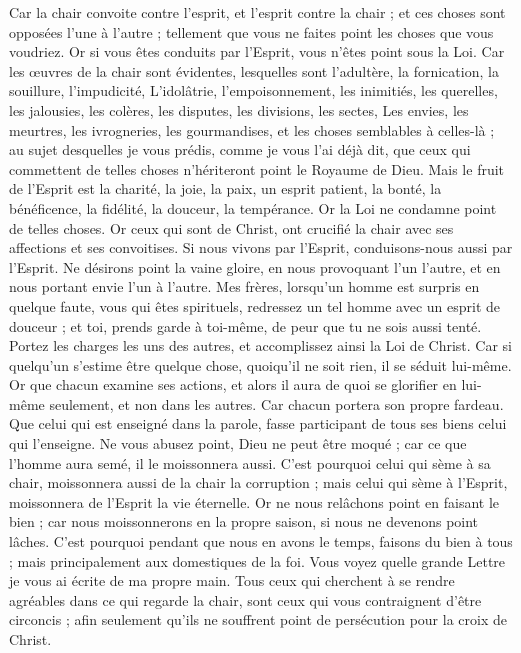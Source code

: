 \begin{multicols}{2}
Car la chair convoite contre l'esprit, et l'esprit contre la chair ; et ces choses sont opposées l'une à l'autre ; tellement que vous ne faites point les choses que vous voudriez.
Or si vous êtes conduits par l'Esprit, vous n'êtes point sous la Loi.
Car les œuvres de la chair sont évidentes, lesquelles sont l'adultère, la fornication, la souillure, l'impudicité,
L'idolâtrie, l'empoisonnement, les inimitiés, les querelles, les jalousies, les colères, les disputes, les divisions, les sectes,
Les envies, les meurtres, les ivrogneries, les gourmandises, et les choses semblables à celles-là ; au sujet desquelles je vous prédis, comme je vous l'ai déjà dit, que ceux qui commettent de telles choses n'hériteront point le Royaume de Dieu.
Mais le fruit de l'Esprit est la charité, la joie, la paix, un esprit patient, la bonté, la bénéficence, la fidélité, la douceur, la tempérance.
Or la Loi ne condamne point de telles choses.
Or ceux qui sont de Christ, ont crucifié la chair avec ses affections et ses convoitises.
Si nous vivons par l'Esprit, conduisons-nous aussi par l'Esprit.
Ne désirons point la vaine gloire, en nous provoquant l'un l'autre, et en nous portant envie l'un à l'autre.
\VerseOne{}Mes frères, lorsqu'un homme est surpris en quelque faute, vous qui êtes spirituels, redressez un tel homme avec un esprit de douceur ; et toi, prends garde à toi-même, de peur que tu ne sois aussi tenté.
Portez les charges les uns des autres, et accomplissez ainsi la Loi de Christ.
Car si quelqu'un s'estime être quelque chose, quoiqu'il ne soit rien, il se séduit lui-même.
Or que chacun examine ses actions, et alors il aura de quoi se glorifier en lui-même seulement, et non dans les autres.
Car chacun portera son propre fardeau.
Que celui qui est enseigné dans la parole, fasse participant de tous ses biens celui qui l'enseigne.
Ne vous abusez point, Dieu ne peut être moqué ; car ce que l'homme aura semé, il le moissonnera aussi.
C'est pourquoi celui qui sème à sa chair, moissonnera aussi de la chair la corruption ; mais celui qui sème à l'Esprit, moissonnera de l'Esprit la vie éternelle.
Or ne nous relâchons point en faisant le bien ; car nous moissonnerons en la propre saison, si nous ne devenons point lâches.
C'est pourquoi pendant que nous en avons le temps, faisons du bien à tous ; mais principalement aux domestiques de la foi.
Vous voyez quelle grande Lettre je vous ai écrite de ma propre main.
Tous ceux qui cherchent à se rendre agréables dans ce qui regarde la chair, sont ceux qui vous contraignent d'être circoncis ; afin seulement qu'ils ne souffrent point de persécution pour la croix de Christ.

\end{multicols}
